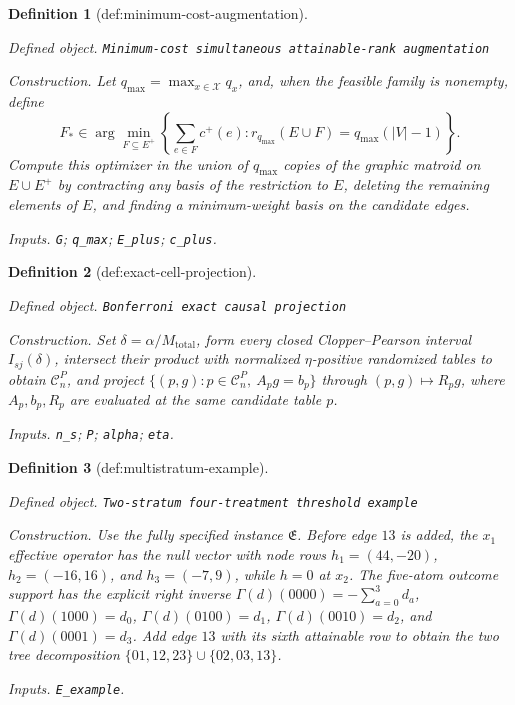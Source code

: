 \documentclass{article}
\newtheorem{definition}{Definition}
\begin{document}
\begin{definition}[def:minimum-cost-augmentation]\label{def:minimum-cost-augmentation}
\par\smallskip\noindent\emph{Defined object.} \texttt{Minimum-\allowbreak{}cost simultaneous attainable-\allowbreak{}rank augmentation}
\par\smallskip\noindent\emph{Construction.} Let \(q_{\max}=\max_{x\in\mathcal X}q_x\), and, when the feasible family is nonempty, define
\[
F_*\in\arg\min_{F\subseteq E^+}
\left\{\sum_{e\in F}c^+(e):
r_{q_{\max}}(E\cup F)=q_{\max}(|V|-1)\right\}.
\]
Compute this optimizer in the union of \(q_{\max}\) copies of the graphic matroid on \(E\cup E^+\) by contracting any basis of the restriction to \(E\), deleting the remaining elements of \(E\), and finding a minimum-weight basis on the candidate edges.
\par\smallskip\noindent\emph{Inputs.} \texttt{G}; \texttt{q\_\allowbreak{}max}; \texttt{E\_\allowbreak{}plus}; \texttt{c\_\allowbreak{}plus}.
\end{definition}

\begin{definition}[def:exact-cell-projection]\label{def:exact-cell-projection}
\par\smallskip\noindent\emph{Defined object.} \texttt{Bonferroni exact causal projection}
\par\smallskip\noindent\emph{Construction.} Set \(\delta=\alpha/M_{\mathrm{total}}\), form every closed Clopper--Pearson interval \(I_{sj}(\delta)\), intersect their product with normalized \(\eta\)-positive randomized tables to obtain \(\mathcal C_n^P\), and project \(\{(p,g):p\in\mathcal C_n^P,\ A_p g=b_p\}\) through \((p,g)\mapsto R_p g\), where \(A_p,b_p,R_p\) are evaluated at the same candidate table \(p\).
\par\smallskip\noindent\emph{Inputs.} \texttt{n\_\allowbreak{}s}; \texttt{P}; \texttt{alpha}; \texttt{eta}.
\end{definition}

\begin{definition}[def:multistratum-example]\label{def:multistratum-example}
\par\smallskip\noindent\emph{Defined object.} \texttt{Two-\allowbreak{}stratum four-\allowbreak{}treatment threshold example}
\par\smallskip\noindent\emph{Construction.} Use the fully specified instance \(\mathfrak E\). Before edge \(13\) is added, the \(x_1\) effective operator has the null vector with node rows \(h_1=(44,-20)\), \(h_2=(-16,16)\), and \(h_3=(-7,9)\), while \(h=0\) at \(x_2\). The five-atom outcome support has the explicit right inverse \(\Gamma(d)(0000)=-\sum_{a=0}^3d_a\), \(\Gamma(d)(1000)=d_0\), \(\Gamma(d)(0100)=d_1\), \(\Gamma(d)(0010)=d_2\), and \(\Gamma(d)(0001)=d_3\). Add edge \(13\) with its sixth attainable row to obtain the two tree decomposition \(\{01,12,23\}\cup\{02,03,13\}\).
\par\smallskip\noindent\emph{Inputs.} \texttt{E\_\allowbreak{}example}.
\end{definition}
\end{document}

